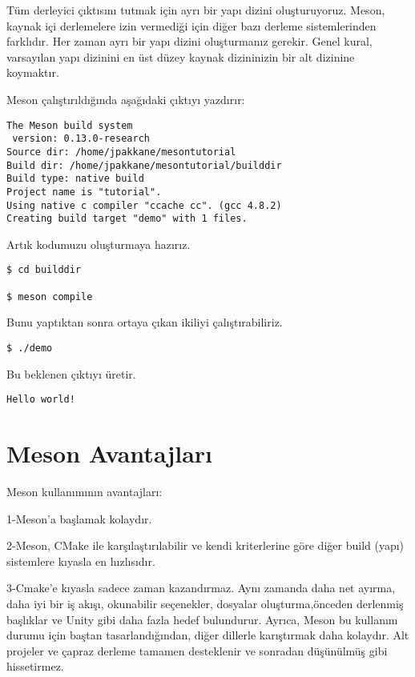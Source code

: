 \documentclass[
]{book}
\begin{document}
Tüm derleyici çıktısını tutmak için ayrı bir yapı dizini oluşturuyoruz. Meson, kaynak içi derlemelere izin vermediği için diğer bazı derleme sistemlerinden farklıdır. Her zaman ayrı bir yapı dizini oluşturmanız gerekir. Genel kural, varsayılan yapı dizinini en üst düzey kaynak dizininizin bir alt dizinine koymaktır.

Meson çalıştırıldığında aşağıdaki çıktıyı yazdırır:

\begin{verbatim}
The Meson build system
 version: 0.13.0-research
Source dir: /home/jpakkane/mesontutorial
Build dir: /home/jpakkane/mesontutorial/builddir
Build type: native build
Project name is "tutorial".
Using native c compiler "ccache cc". (gcc 4.8.2)
Creating build target "demo" with 1 files.
\end{verbatim}

Artık kodumuzu oluşturmaya hazırız.

\begin{verbatim}
$ cd builddir

$ meson compile
\end{verbatim}

Bunu yaptıktan sonra ortaya çıkan ikiliyi çalıştırabiliriz.

\begin{verbatim}
$ ./demo
\end{verbatim}

Bu beklenen çıktıyı üretir.

\begin{verbatim}
Hello world!
\end{verbatim}

\hypertarget{meson-avantajlarux131}{%
\section{Meson Avantajları}\label{meson-avantajlarux131}}

Meson kullanımının avantajları:

1-Meson'a başlamak kolaydır.

2-Meson, CMake ile karşılaştırılabilir ve kendi kriterlerine göre diğer build (yapı) sistemlere kıyasla en hızlısıdır.

3-Cmake'e kıyasla sadece zaman kazandırmaz. Aynı zamanda daha net ayırma, daha iyi bir iş akışı, okunabilir seçenekler, dosyalar oluşturma,önceden derlenmiş başlıklar ve Unity gibi daha fazla hedef bulundurur.
Ayrıca, Meson bu kullanım durumu için baştan tasarlandığından, diğer dillerle karıştırmak daha kolaydır. Alt projeler ve çapraz derleme tamamen desteklenir ve sonradan düşünülmüş gibi hissetirmez.
\end{document}
